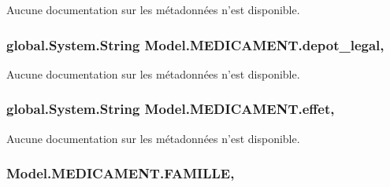Aucune documentation sur les métadonnées n'est disponible. 

\hypertarget{class_model_1_1_m_e_d_i_c_a_m_e_n_t_ad27c0736a77e2ac61cf5d94d7f0ddd00}{
\subsubsection[{depot\-\_\-legal}]{\setlength{\rightskip}{0pt plus 5cm}global.\-System.\-String Model.\-M\-E\-D\-I\-C\-A\-M\-E\-N\-T.\-depot\-\_\-legal\hspace{0.3cm}{\ttfamily [get]}, {\ttfamily [set]}}}\label{class_model_1_1_m_e_d_i_c_a_m_e_n_t_ad27c0736a77e2ac61cf5d94d7f0ddd00}


Aucune documentation sur les métadonnées n'est disponible. 

\hypertarget{class_model_1_1_m_e_d_i_c_a_m_e_n_t_ad94a543654340fa8b32a0f82996fb95b}{
\subsubsection[{effet}]{\setlength{\rightskip}{0pt plus 5cm}global.\-System.\-String Model.\-M\-E\-D\-I\-C\-A\-M\-E\-N\-T.\-effet\hspace{0.3cm}{\ttfamily [get]}, {\ttfamily [set]}}}\label{class_model_1_1_m_e_d_i_c_a_m_e_n_t_ad94a543654340fa8b32a0f82996fb95b}


Aucune documentation sur les métadonnées n'est disponible. 

\hypertarget{class_model_1_1_m_e_d_i_c_a_m_e_n_t_aaaa915cc1d5a5956f312da4191f30757}{
\subsubsection[{F\-A\-M\-I\-L\-L\-E}]{ Model.\-M\-E\-D\-I\-C\-A\-M\-E\-N\-T.\-F\-A\-M\-I\-L\-L\-E\hspace{0.3cm}{\ttfamily [get]}, {\ttfamily [set]}}}\label{class_model_1_1_m_e_d_i_c_a_m_e_n_t_aaaa915cc1d5a5956f312da4191f30757}


